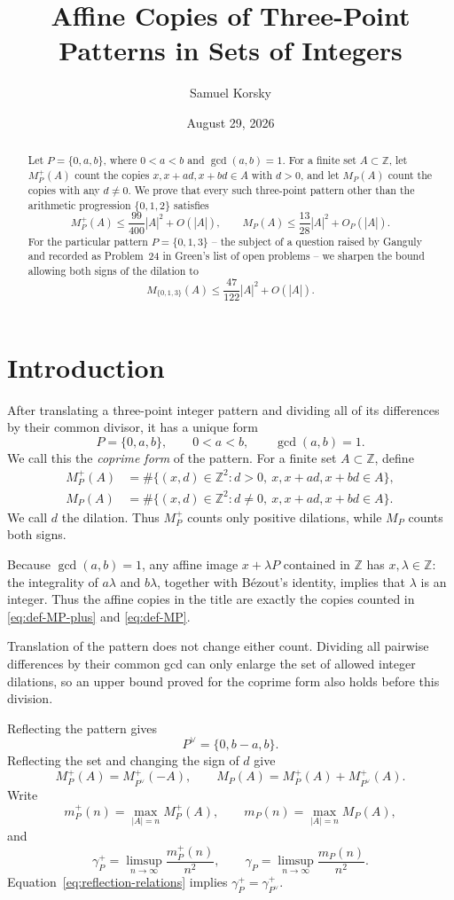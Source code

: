 \documentclass[11pt]{article}
\title{Affine Copies of Three-Point Patterns in Sets of Integers}
\author{Samuel Korsky}
\date{August 29, 2026}
\numberwithin{equation}{section}
\theoremstyle{remark}
\newcommand{\Z}{\mathbb Z}
\begin{document}
\maketitle
\begin{abstract}
\noindent
Let $P=\{0,a,b\}$, where $0<a<b$ and $\gcd(a,b)=1$.  For a finite
set $A\subset\Z$, let $M_P^+(A)$ count the copies
$x,x+ad,x+bd\in A$ with $d>0$, and let $M_P(A)$ count the copies with
any $d\ne0$.  We prove that every such three-point pattern other than the
arithmetic progression $\{0,1,2\}$ satisfies
\[
 M_P^+(A)\le \frac{99}{400}|A|^2+O(|A|),
 \qquad
 M_P(A)\le \frac{13}{28}|A|^2+O_P(|A|).
\]
For the particular pattern $P=\{0,1,3\}$ -- the subject of a question raised
by Ganguly and recorded as Problem~24 in Green's list of open problems -- we
sharpen the bound allowing both signs of the dilation to
\[
 M_{\{0,1,3\}}(A)\le \frac{47}{122}|A|^2+O(|A|).
\]
\end{abstract}

\section{Introduction}
After translating a three-point integer pattern and dividing all of its
differences by their common divisor, it has a unique form
\[
 P=\{0,a,b\},\qquad 0<a<b,\qquad \gcd(a,b)=1.
\]
We call this the \emph{coprime form} of the pattern.  For a finite set
$A\subset\Z$, define
\begin{align}
 M_P^+(A)
 &=\#\{(x,d)\in\Z^2:d>0,\ x,x+ad,x+bd\in A\},
 \label{eq:def-MP-plus}\\
 M_P(A)
 &=\#\{(x,d)\in\Z^2:d\ne0,\ x,x+ad,x+bd\in A\}.
 \label{eq:def-MP}
\end{align}
We call $d$ the dilation.  Thus $M_P^+$ counts only positive dilations,
while $M_P$ counts both signs.

Because $\gcd(a,b)=1$, any affine image $x+\lambda P$ contained in $\Z$ has
$x,\lambda\in\Z$: the integrality of $a\lambda$ and $b\lambda$, together with
B\'ezout's identity, implies that $\lambda$ is an integer.  Thus the affine
copies in the title are exactly the copies counted in
\eqref{eq:def-MP-plus} and \eqref{eq:def-MP}.

Translation of the pattern does not change either count.  Dividing all
pairwise differences by their common gcd can only enlarge the set of allowed
integer dilations, so an upper bound proved for the coprime form also holds
before this division.

Reflecting the pattern gives
\[
 P^\vee=\{0,b-a,b\}.
\]
Reflecting the set and changing the sign of $d$ give
\begin{equation}\label{eq:reflection-relations}
 M_P^+(A)=M_{P^\vee}^+(-A),
 \qquad
 M_P(A)=M_P^+(A)+M_{P^\vee}^+(A).
\end{equation}
Write
\[
 m_P^+(n)=\max_{|A|=n}M_P^+(A),
 \qquad
 m_P(n)=\max_{|A|=n}M_P(A),
\]
and
\[
 \gamma_P^+=\limsup_{n\to\infty}\frac{m_P^+(n)}{n^2},
 \qquad
 \gamma_P=\limsup_{n\to\infty}\frac{m_P(n)}{n^2}.
\]
Equation~\eqref{eq:reflection-relations} implies
$\gamma_P^+=\gamma_{P^\vee}^+$.
\end{document}
